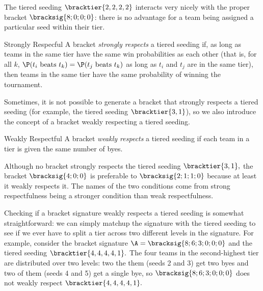 {    The tiered seeding $\bracktier{2,2,2,2}$ interacts very nicely with the proper bracket $\bracksig{8;0;0;0}$: there is no advantage for a team being assigned a particular seed within their tier.

    \begin{definition}{Strongly Respecful}{}
        A bracket \textit{strongly respects} a tiered seeding if, as long as teams in the same tier have the same win probabilities as each other (that is, for all $k$, $\P(t_i \textrm{ beats } t_k) = \P(t_j \textrm{ beats } t_k)$ as long as $t_i$ and $t_j$ are in the same tier), then teams in the same tier have the same probability of winning the tournament.
    \end{definition}

    Sometimes, it is not possible to generate a bracket that strongly respects a tiered seeding (for example, the tiered seeding $\bracktier{3, 1}$), so we also introduce the concept of a bracket weakly respecting a tiered seeding.

    \begin{definition}{Weakly Respectful}{}
        A bracket \textit{weakly respects} a tiered seeding if each team in a tier is given the same number of byes.
    \end{definition}

    Although no bracket strongly respects the tiered seeding $\bracktier{3, 1},$ the bracket $\bracksig{4;0;0}$ is preferable to $\bracksig{2;1;1;0}$ because at least it weakly respects it. The names of the two conditions come from strong respectfulness being a stronger condition than weak respectfulness.


    Checking if a bracket signature weakly respects a tiered seeding is somewhat straightforward: we can simply matchup the signature with the tiered seeding to see if we ever have to split a tier across two different levels in the signature. For example, consider the bracket signature $\A = \bracksig{8;6;3;0;0;0}$ and the tiered seeding $\bracktier{4,4,4,4,1}.$ The four teams in the second-highest tier are distributed over two levels: two the them (seeds 2 and 3) get two byes and two of them (seeds 4 and 5) get a single bye, so $\bracksig{8;6;3;0;0;0}$ does not weakly respect $\bracktier{4,4,4,4,1}.$

}
